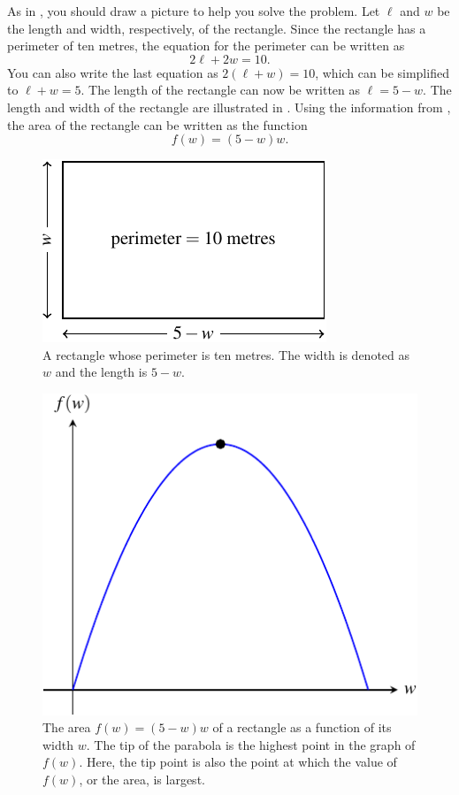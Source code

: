 \documentclass[a4paper,oneside,12pt]{article}
\begin{document}
\begin{solution}
As in , you
should draw a picture to help you solve the problem.  Let $\ell$ and
$w$ be the length and width, respectively, of the rectangle.  Since
the rectangle has a perimeter of ten metres, the equation for the
perimeter can be written as
\[
2\ell + 2w
=
10.
\]
You can also write the last equation as $2(\ell + w) = 10$, which can
be simplified to $\ell + w = 5$.  The length of the rectangle can now
be written as $\ell = 5 - w$.  The length and width of the rectangle
are illustrated in .  Using the
information from , the area of the
rectangle can be written as the function
\[
f(w)
=
(5 - w)w.
\]

\begin{figure}[!htbp]
\centering
\includegraphics[scale=1]{image/09/largest-area.pdf}
\caption{%
  A rectangle whose perimeter is ten metres.  The width is denoted as
  $w$ and the length is $5 - w$.
}
\label{fig:largest_area_rectangle}
\end{figure}

\begin{figure}[!htbp]
\centering
\includegraphics[scale=1]{image/09/rectangle-area.pdf}
\caption{%
  The area $f(w) = (5 - w) w$ of a rectangle as a function of its
  width $w$.  The tip of the parabola is the highest point in the
  graph of $f(w)$.  Here, the tip point is also the point at which the
  value of $f(w)$, or the area, is largest.
}
\label{fig:largest_area_graph_parabola}
\end{figure}


\end{solution}
\end{document}
